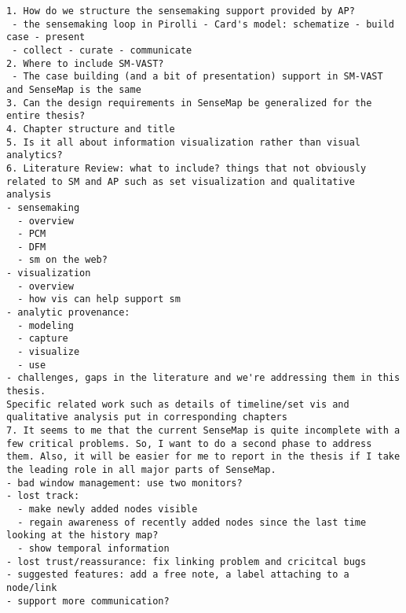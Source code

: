\begin{lstlisting}
1. How do we structure the sensemaking support provided by AP?
 - the sensemaking loop in Pirolli - Card's model: schematize - build case - present
 - collect - curate - communicate
2. Where to include SM-VAST?
 - The case building (and a bit of presentation) support in SM-VAST and SenseMap is the same
3. Can the design requirements in SenseMap be generalized for the entire thesis?
4. Chapter structure and title
5. Is it all about information visualization rather than visual analytics?
6. Literature Review: what to include? things that not obviously related to SM and AP such as set visualization and qualitative analysis
- sensemaking
  - overview
  - PCM
  - DFM
  - sm on the web?
- visualization
  - overview
  - how vis can help support sm 
- analytic provenance:
  - modeling
  - capture
  - visualize
  - use
- challenges, gaps in the literature and we're addressing them in this thesis.
Specific related work such as details of timeline/set vis and qualitative analysis put in corresponding chapters
7. It seems to me that the current SenseMap is quite incomplete with a few critical problems. So, I want to do a second phase to address them. Also, it will be easier for me to report in the thesis if I take the leading role in all major parts of SenseMap.
- bad window management: use two monitors?
- lost track: 
  - make newly added nodes visible
  - regain awareness of recently added nodes since the last time looking at the history map?
  - show temporal information
- lost trust/reassurance: fix linking problem and cricitcal bugs
- suggested features: add a free note, a label attaching to a node/link
- support more communication?

\end{lstlisting}

